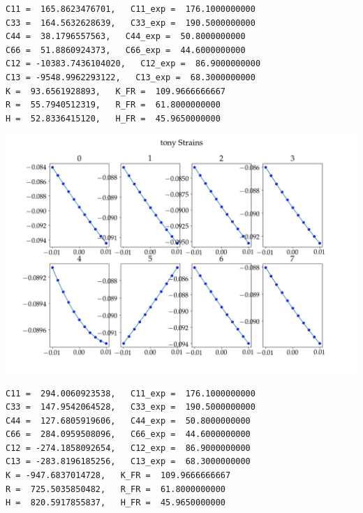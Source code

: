 \documentclass[11pt]{article}
\begin{document}
\begin{enumerate}
\begin{enumerate}
\begin{enumerate}
\begin{verbatim}
C11 =  165.8623476701,   C11_exp =  176.1000000000
C33 =  164.5632628639,   C33_exp =  190.5000000000
C44 =  38.1796557563,   C44_exp =  50.8000000000
C66 =  51.8860924373,   C66_exp =  44.6000000000
C12 = -10383.7436104020,   C12_exp =  86.9000000000
C13 = -9548.9962293122,   C13_exp =  68.3000000000
K =  93.6561928893,   K_FR =  109.9666666667
R =  55.7940512319,   R_FR =  61.8000000000
H =  52.8336415120,   H_FR =  45.9650000000

\end{verbatim}

\begin{center}
\includegraphics[width=.9\linewidth]{Images/tonystrains.png}
\end{center}
\begin{verbatim}
C11 =  294.0060923538,   C11_exp =  176.1000000000
C33 =  147.9542064528,   C33_exp =  190.5000000000
C44 =  127.6805919606,   C44_exp =  50.8000000000
C66 =  284.0959508096,   C66_exp =  44.6000000000
C12 = -274.1858092654,   C12_exp =  86.9000000000
C13 = -283.8196185256,   C13_exp =  68.3000000000
K = -947.6837014728,   K_FR =  109.9666666667
R =  725.5035850482,   R_FR =  61.8000000000
H =  820.5917855837,   H_FR =  45.9650000000

\end{verbatim}


\end{enumerate}
\end{enumerate}
\end{enumerate}
\end{document}
